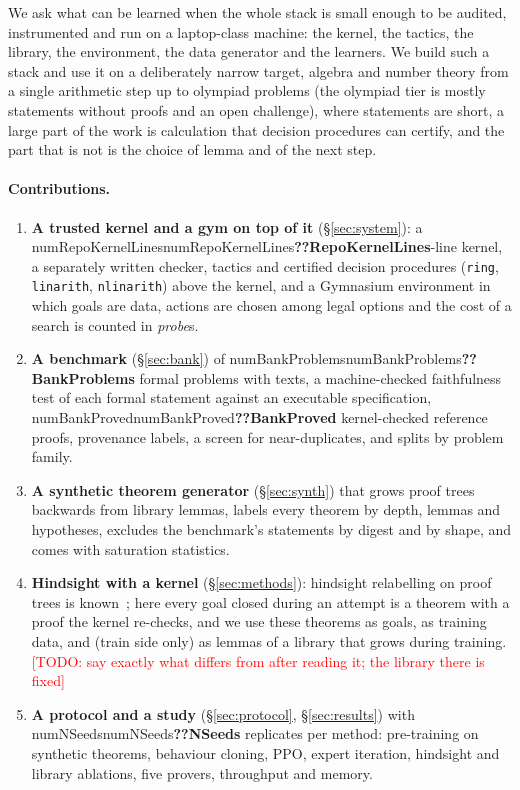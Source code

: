 \documentclass[10pt]{article}
\newcommand{\N}[1]{\ifcsname num#1\endcsname\csname num#1\endcsname\else\textbf{??#1}\fi}          %
\newcommand{\todo}[1]{\textcolor{red}{[TODO: #1]}}                                                    %
\newcommand{\code}[1]{\texttt{#1}}
\newcommand{\probe}{\emph{probe}}
\begin{document}
We ask what can be learned when the whole stack is small enough to be audited, instrumented and run on a laptop-class machine: the kernel, the tactics, the library, the environment, the data generator and the learners.
We build such a stack and use it on a deliberately narrow target, algebra and number theory from a single arithmetic step up to olympiad problems (the olympiad tier is mostly statements without proofs and an open challenge), where statements are short, a large part of the work is calculation that decision procedures can certify, and the part that is not is the choice of lemma and of the next step.

\paragraph{Contributions.}
\begin{enumerate}
\item \textbf{A trusted kernel and a gym on top of it} (\S\ref{sec:system}): a \N{RepoKernelLines}-line kernel, a separately written checker, tactics and certified decision procedures (\code{ring}, \code{linarith}, \code{nlinarith}) above the kernel, and a Gymnasium environment in which goals are data, actions are chosen among legal options and the cost of a search is counted in \probe{}s.
\item \textbf{A benchmark} (\S\ref{sec:bank}) of \N{BankProblems} formal problems with texts, a machine-checked faithfulness test of each formal statement against an executable specification, \N{BankProved} kernel-checked reference proofs, provenance labels, a screen for near-duplicates, and splits by problem family.
\item \textbf{A synthetic theorem generator} (\S\ref{sec:synth}) that grows proof trees backwards from library lemmas, labels every theorem by depth, lemmas and hypotheses, excludes the benchmark's statements by digest and by shape, and comes with saturation statistics.
\item \textbf{Hindsight with a kernel} (\S\ref{sec:methods}): hindsight relabelling on proof trees is known~\citep{poesia2024learning}; here every goal closed during an attempt is a theorem with a proof the kernel re-checks, and we use these theorems as goals, as training data, and (train side only) as lemmas of a library that grows during training. \todo{say exactly what differs from \citet{poesia2024learning} after reading it; the library there is fixed}
\item \textbf{A protocol and a study} (\S\ref{sec:protocol}, \S\ref{sec:results}) with \N{NSeeds} replicates per method: pre-training on synthetic theorems, behaviour cloning, PPO, expert iteration, hindsight and library ablations, five provers, throughput and memory.
\end{enumerate}
\end{document}
